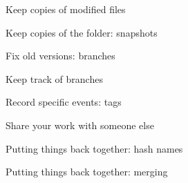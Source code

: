\documentclass[english]{slides}
\begin{document}
\begin{frame}{Keep copies of modified files}
\end{frame}

\begin{frame}{Keep copies of the folder: snapshots}

\end{frame}

\begin{frame}{Fix old versions: branches}

\end{frame}

\begin{frame}{Keep track of branches}
\end{frame}

\begin{frame}{Record specific events: tags}
\end{frame}

\begin{frame}{Share your work with someone else}
\end{frame}

\begin{frame}{Putting things back together: hash names}
\end{frame}

\begin{frame}{Putting things back together: merging}
\end{frame}
\end{document}
